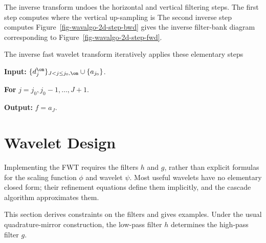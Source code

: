 The inverse transform undoes the horizontal and vertical filtering steps.
The first step computes
where the vertical up-sampling is
The second inverse step computes
Figure~\ref{fig-wavalgo-2d-step-bwd} gives the inverse filter-bank diagram corresponding to Figure~\ref{fig-wavalgo-2d-step-fwd}.


The inverse fast wavelet transform iteratively applies these elementary steps
\begin{rs}
	\item \textbf{Input:} $\{d_j^\om\}_{J<j\leq j_0,\om} \cup \{ a_{j_0} \}$.
	\item \textbf{For} $j=j_0,j_0-1,\ldots,J+1$.
	\item \textbf{Output:} $f = a_J$.
\end{rs}




                                   
                                   
\section{Wavelet Design}

Implementing the FWT requires the filters $h$ and $g$, rather than explicit formulas for the scaling function $\phi$ and wavelet $\psi$. Most useful wavelets have no elementary closed form; their refinement equations define them implicitly, and the cascade algorithm approximates them.

This section derives constraints on the filters and gives examples. Under the usual quadrature-mirror construction, the low-pass filter $h$ determines the high-pass filter $g$.



